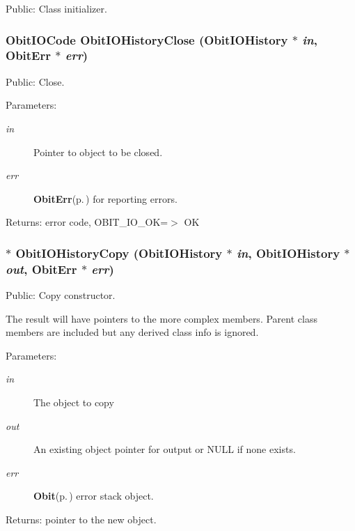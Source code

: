 Public: Class initializer. 

\subsubsection{\setlength{\rightskip}{0pt plus 5cm}Obit\-IOCode Obit\-IOHistory\-Close ({\bf Obit\-IOHistory} $\ast$ {\em in}, {\bf Obit\-Err} $\ast$ {\em err})}\label{ObitIOHistory_8h_a13}


Public: Close. 

\begin{Desc}
\item[Parameters:]
\begin{description}
\item[{\em in}]Pointer to object to be closed. \item[{\em err}]{\bf Obit\-Err}{\rm (p.\,\pageref{structObitErr})} for reporting errors. \end{description}
\end{Desc}
\begin{Desc}
\item[Returns:]error code, OBIT\_\-IO\_\-OK=$>$ OK \end{Desc}
\subsubsection{$\ast$ Obit\-IOHistory\-Copy ({\bf Obit\-IOHistory} $\ast$ {\em in}, {\bf Obit\-IOHistory} $\ast$ {\em out}, {\bf Obit\-Err} $\ast$ {\em err})}\label{ObitIOHistory_8h_a11}


Public: Copy constructor. 

The result will have pointers to the more complex members. Parent class members are included but any derived class info is ignored. \begin{Desc}
\item[Parameters:]
\begin{description}
\item[{\em in}]The object to copy \item[{\em out}]An existing object pointer for output or NULL if none exists. \item[{\em err}]{\bf Obit}{\rm (p.\,\pageref{structObit})} error stack object. \end{description}
\end{Desc}
\begin{Desc}
\item[Returns:]pointer to the new object. \end{Desc}

